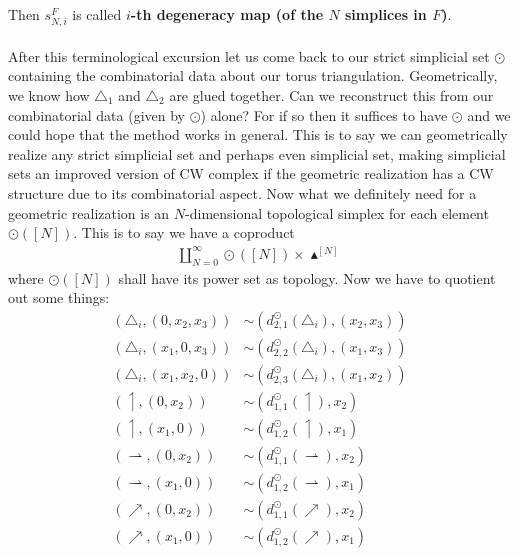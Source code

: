 Then $s_{N,i}^{F}$ is called \textbf{$i$-th degeneracy map (of the $N$ simplices in $F$)}.
\\\\
After this terminological excursion let us come back to our strict simplicial set $\odot$ containing the combinatorial data about our torus triangulation. Geometrically, we know how $\triangle_{1}$ and $\triangle_{2}$ are glued together. Can we reconstruct this from our combinatorial data (given by $\odot$) alone? For if so then it suffices to have $\odot$ and we could hope that the method works in general. This is to say we can geometrically realize any strict simplicial set and perhaps even simplicial set, making simplicial sets an improved version of CW complex if the geometric realization has a CW structure due to its combinatorial aspect. Now what we definitely need for a geometric realization is an $N$-dimensional topological simplex for each element $\odot([N])$. This is to say we have a coproduct
\begin{align*}
  \coprod_{N=0}^{\infty}
  \odot([N])
  \times
  \blacktriangle^{[N]}
\end{align*}
where $\odot([N])$ shall have its power set as topology. Now we have to quotient out some things:
\begin{align*}
  \left(
    \triangle_{i},
    (0,x_{2},x_{3})
  \right)
  &\sim
  \left(
    d_{2,1}^{\odot}(\triangle_{i}),
    (x_{2},x_{3})
  \right)
  \\
  \left(
    \triangle_{i},
    (x_{1},0,x_{3})
  \right)
  &\sim
  \left(
    d_{2,2}^{\odot}(\triangle_{i}),
    (x_{1},x_{3})
  \right)
  \\
  \left(
    \triangle_{i},
    (x_{1},x_{2},0)
  \right)
  &\sim
  \left(
    d_{2,3}^{\odot}(\triangle_{i}),
    (x_{1},x_{2})
  \right)
  \\
  \left(
    \upharpoonleft,
    (0,x_{2})
  \right)
  &\sim
  \left(
    d_{1,1}^{\odot}(\upharpoonleft),
    x_{2}
  \right)
  \\
  \left(
    \upharpoonleft,
    (x_{1},0)
  \right)
  &\sim
  \left(
    d_{1,2}^{\odot}(\upharpoonleft),
    x_{1}
  \right)
  \\
  \left(
    \rightharpoonup,
    (0,x_{2})
  \right)
  &\sim
  \left(
    d_{1,1}^{\odot}(\rightharpoonup),
    x_{2}
  \right)
  \\
  \left(
    \rightharpoonup,
    (x_{1},0)
  \right)
  &\sim
  \left(
    d_{1,2}^{\odot}(\rightharpoonup),
    x_{1}
  \right)
  \\
  \left(
    \nearrow,
    (0,x_{2})
  \right)
  &\sim
  \left(
    d_{1,1}^{\odot}(\nearrow),
    x_{2}
  \right)
  \\
  \left(
    \nearrow,
    (x_{1},0)
  \right)
  &\sim
  \left(
    d_{1,2}^{\odot}(\nearrow),
    x_{1}
  \right)
\end{align*}
